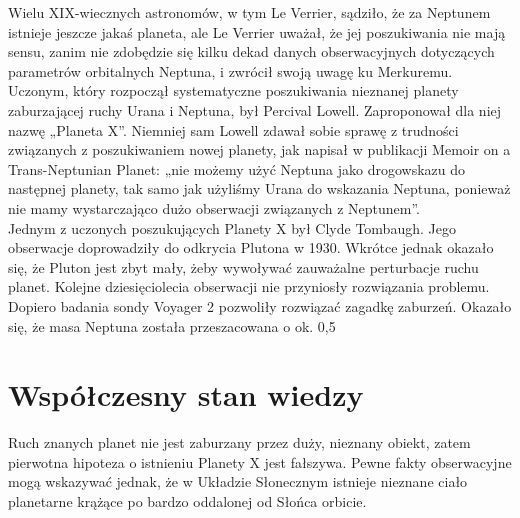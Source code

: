 \documentclass[12pt]{article}
\begin{document}
Wielu XIX-wiecznych astronomów, w tym Le Verrier, sądziło, że za Neptunem istnieje jeszcze jakaś planeta, ale Le Verrier uważał, że jej poszukiwania nie mają sensu, zanim nie zdobędzie się kilku dekad danych obserwacyjnych dotyczących parametrów orbitalnych Neptuna, i zwrócił swoją uwagę ku Merkuremu. Uczonym, który rozpoczął systematyczne poszukiwania nieznanej planety zaburzającej ruchy Urana i Neptuna, był Percival Lowell. Zaproponował dla niej nazwę „Planeta X”. Niemniej sam Lowell zdawał sobie sprawę z trudności związanych z poszukiwaniem nowej planety, jak napisał w publikacji Memoir on a Trans-Neptunian Planet: „nie możemy użyć Neptuna jako drogowskazu do następnej planety, tak samo jak użyliśmy Urana do wskazania Neptuna, ponieważ nie mamy wystarczająco dużo obserwacji związanych z Neptunem”.\\

Jednym z uczonych poszukujących Planety X był Clyde Tombaugh. Jego obserwacje doprowadziły do odkrycia Plutona w 1930. Wkrótce jednak okazało się, że Pluton jest zbyt mały, żeby wywoływać zauważalne perturbacje ruchu planet. Kolejne dziesięciolecia obserwacji nie przyniosły rozwiązania problemu.\\

Dopiero badania sondy Voyager 2 pozwoliły rozwiązać zagadkę zaburzeń. Okazało się, że masa Neptuna została przeszacowana o ok. 0,5%

\section{Współczesny stan wiedzy}
Ruch znanych planet nie jest zaburzany przez duży, nieznany obiekt, zatem pierwotna hipoteza o istnieniu Planety X jest fałszywa. Pewne fakty obserwacyjne mogą wskazywać jednak, że w Układzie Słonecznym istnieje nieznane ciało planetarne krążące po bardzo oddalonej od Słońca orbicie.\\
\end{document}
